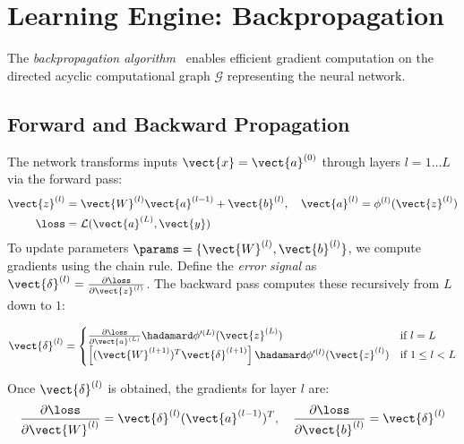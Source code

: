 \section{Learning Engine: Backpropagation}

The \emph{backpropagation algorithm}~\cite{Rumelhart1986} enables efficient gradient computation on the directed acyclic computational graph $\mathcal{G}$ representing the neural network.

\subsection{Forward and Backward Propagation}

The network transforms inputs $\vect{x} = \vect{a}^{(0)}$ through layers $l=1 \dots L$ via the forward pass:
\begin{align}
	\vect{z}^{(l)} &= \vect{W}^{(l)} \vect{a}^{(l-1)} + \vect{b}^{(l)}, \quad \vect{a}^{(l)} = \phi^{(l)}(\vect{z}^{(l)}) \\
	\loss &= \mathcal{L}(\vect{a}^{(L)}, \vect{y})
\end{align}
To update parameters $\params = \{\vect{W}^{(l)}, \vect{b}^{(l)}\}$, we compute gradients using the chain rule. Define the \emph{error signal} as $\vect{\delta}^{(l)} = \frac{\partial \loss}{\partial \vect{z}^{(l)}}$. The backward pass computes these recursively from $L$ down to $1$:

\begin{equation}
	\vect{\delta}^{(l)} = 
	\begin{cases} 
		\frac{\partial \loss}{\partial \vect{a}^{(L)}} \hadamard \phi'^{(L)}(\vect{z}^{(L)}) & \text{if } l=L \\
		\left[(\vect{W}^{(l+1)})^T \vect{\delta}^{(l+1)}\right] \hadamard \phi'^{(l)}(\vect{z}^{(l)}) & \text{if } 1 \le l < L
	\end{cases}
	\label{eq:backprop_recurrence}
\end{equation}

Once $\vect{\delta}^{(l)}$ is obtained, the gradients for layer $l$ are:
\begin{equation}
	\frac{\partial \loss}{\partial \vect{W}^{(l)}} = \vect{\delta}^{(l)} (\vect{a}^{(l-1)})^T, \quad
	\frac{\partial \loss}{\partial \vect{b}^{(l)}} = \vect{\delta}^{(l)}
\end{equation}

